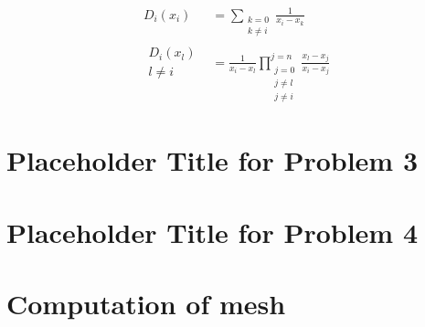\documentclass{article}
\begin{document}
\begin{align}
D_i(x_i) & = \sum_{\begin{matrix}k=0\\k\neq i\end{matrix}} \frac{1}{x_i - x_k}\\
\begin{matrix}D_i(x_l)\\l \neq i\end{matrix} & = \frac{1}{x_i - x_l} 
	\prod_{
		\begin{matrix} j = 0 \\ j \neq l\\j \neq i \end{matrix}}^{j=n}
		\frac{x_l - x_j}{x_i - x_j} 
\end{align}

\section{Placeholder Title for Problem 3}

\section{Placeholder Title for Problem 4}

\section{Computation of mesh}
\end{document}
